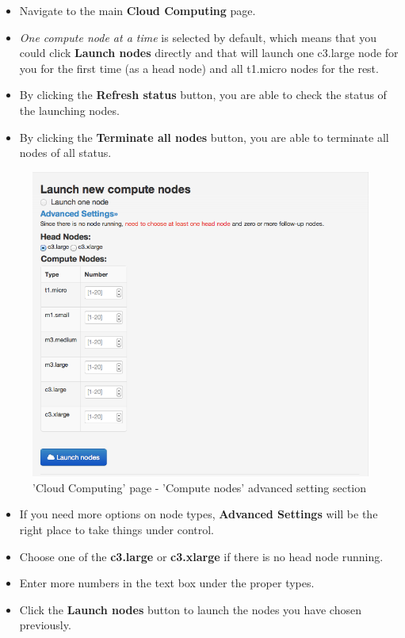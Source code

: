 \begin{itemize}
\item Navigate to the main \textbf{Cloud Computing} page.%
\item \textit{One compute node at a time} is selected by default, which means that you could click \textbf{Launch nodes} directly and that will launch one c3.large node for you for the first time (as a head node) and all t1.micro nodes for the rest.
\item By clicking the \textbf{Refresh status} button, you are able to check the status of the launching nodes.
\item By clicking the \textbf{Terminate all nodes} button, you are able to terminate all nodes of all status. 

\end{itemize}

\begin{figure}[!ht]
\centering
\includegraphics[scale=0.45]{T6/T6_fig_computenode2.png}
\caption{'Cloud Computing' page - 'Compute nodes' advanced setting section}
\label{fig:2}
\end{figure}

\begin{itemize}
\item If you need more options on node types, \textbf{Advanced Settings} will be the right place to take things under control.
\item Choose one of the \textbf{c3.large} or \textbf{c3.xlarge} if there is no head node running.
\item Enter more numbers in the text box under the proper types.
\item Click the \textbf{Launch nodes} button to launch the nodes you have chosen previously.
\end{itemize}


